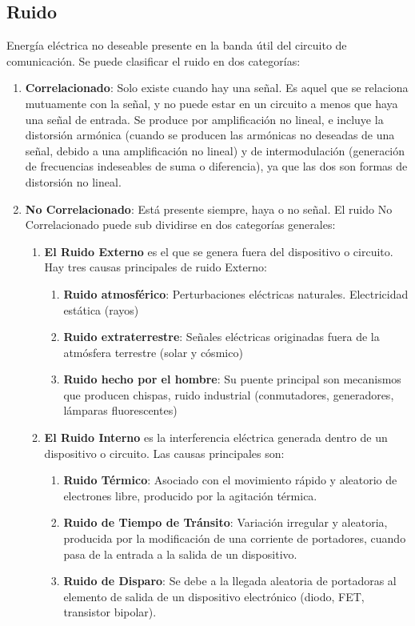 \documentclass[12pt,fleqn,a4paper,oneside]{LegrandOrangeBook}
\begin{document}
\subsection*{Ruido}
Energía eléctrica no deseable presente en la banda útil del circuito de comunicación. Se puede clasificar el ruido en dos categorías:
\begin{enumerate}
\item \textbf{Correlacionado}: Solo existe cuando hay una señal. Es aquel que se relaciona mutuamente con la señal, y no puede estar en un circuito a menos que haya una señal de entrada.
Se produce por amplificación no lineal, e incluye la distorsión armónica (cuando se producen las armónicas no deseadas de una señal, debido a una amplificación no lineal) y de intermodulación (generación de frecuencias indeseables de suma o diferencia), ya que las dos son formas de distorsión no lineal.

\item \textbf{No Correlacionado}: Está presente siempre, haya o no señal. El ruido No Correlacionado puede sub dividirse en dos categorías generales:
\begin{enumerate}
\item \textbf{El Ruido Externo }es el que se genera fuera del dispositivo o circuito. Hay tres causas principales de ruido Externo:
\begin{enumerate}
\item \textbf{Ruido atmosférico}: Perturbaciones eléctricas naturales. Electricidad estática (rayos)
\item \textbf{Ruido extraterrestre}: Señales eléctricas originadas fuera de la atmósfera terrestre (solar y cósmico)
\item \textbf{Ruido hecho por el hombre}: Su puente principal son mecanismos que producen chispas, ruido industrial (conmutadores, generadores, lámparas fluorescentes)
\end{enumerate}
\item \textbf{El Ruido Interno} es la interferencia eléctrica generada dentro de un dispositivo o circuito. Las causas principales son:
\begin{enumerate}
\item \textbf{Ruido Térmico}: Asociado con el movimiento rápido y aleatorio de electrones libre, producido por la agitación térmica.
\item \textbf{Ruido de Tiempo de Tránsito}: Variación irregular y aleatoria, producida por la modificación de una corriente de portadores, cuando pasa de la entrada a la salida de un dispositivo.
\item \textbf{Ruido de Disparo}: Se debe a la llegada aleatoria de portadoras al elemento de salida de un dispositivo electrónico (diodo, FET, transistor bipolar).
\end{enumerate}
\end{enumerate}
\end{enumerate}
\end{document}
